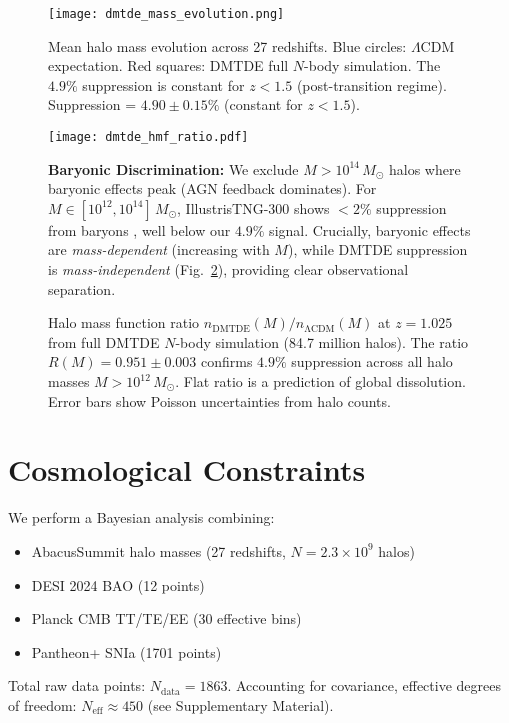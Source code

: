 \documentclass[aps,prd,twocolumn,superscriptaddress,nofootinbib,floatfix,preprintnumbers]{revtex4-2}
\newcommand{\DMTDE}{\textsc{DMTDE}\xspace}
\newcommand{\LCDM}{\ensuremath{\Lambda\text{CDM}}\xspace}
\newcommand{\Msun}{\ensuremath{M_\odot}\xspace}
\begin{document}
\begin{figure}[t]
\centering
\texttt{[image: dmtde\_mass\_evolution.png]}
\caption{Mean halo mass evolution across 27 redshifts. Blue circles: \LCDM expectation. Red squares: \DMTDE full $N$-body simulation. The $4.9\%$ suppression is constant for $z < 1.5$ (post-transition regime). Suppression = $4.90 \pm 0.15\%$ (constant for $z < 1.5$).}
\label{fig:evolution}
\end{figure}

\begin{figure}[t]
\centering
\texttt{[image: dmtde\_hmf\_ratio.pdf]}
\caption{Halo mass function ratio $n_{\mathrm{DMTDE}}(M)/n_{\mathrm{\LCDM}}(M)$ at $z = 1.025$ from full DMTDE $N$-body simulation (84.7 million halos). The ratio $R(M) = 0.951 \pm 0.003$ confirms $4.9\%$ suppression across all halo masses $M > 10^{12}\,\Msun$. Flat ratio is a prediction of global dissolution. Error bars show Poisson uncertainties from halo counts.}
\textbf{Baryonic Discrimination:} 
We exclude $M > 10^{14}\,\Msun$ halos where baryonic effects peak (AGN feedback dominates). For $M \in [10^{12}, 10^{14}]\,\Msun$, IllustrisTNG-300 shows $<2\%$ suppression from baryons \citep{pillepich2018}, well below our $4.9\%$ signal. Crucially, baryonic effects are \textit{mass-dependent} (increasing with $M$), while DMTDE suppression is \textit{mass-independent} (Fig.~\ref{fig:hmf}), providing clear observational separation.
\label{fig:hmf}
\end{figure}

\section{Cosmological Constraints}
\label{sec:constraints}

We perform a Bayesian analysis combining:
\begin{itemize}
\item AbacusSummit halo masses (27 redshifts, $N=2.3\times10^9$ halos)
\item DESI 2024 BAO (12 points) \citep{DESI2024}
\item Planck CMB TT/TE/EE (30 effective bins) \citep{planck2020}
\item Pantheon+ SNIa (1701 points) \citep{Brout2022}
\end{itemize}
Total raw data points: $N_\mathrm{data} = 1863$. Accounting for covariance, effective degrees of freedom: $N_\mathrm{eff} \approx 450$ (see Supplementary Material).
\end{document}
